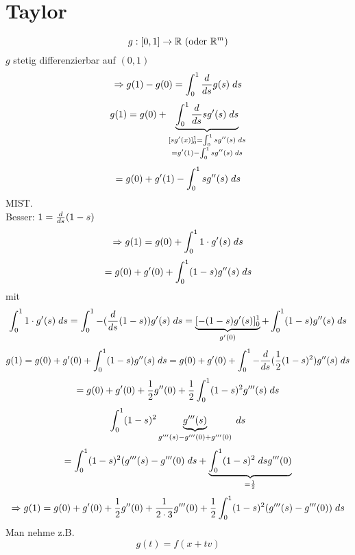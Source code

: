 \documentclass[../ana2.tex]{subfiles}
\begin{document}
\setcounter{section}{14}
\section{Taylor}
\[ \abb{g}{[0,1]}{\R} \text{ (oder \(\R^m\))} \]
\( g \) stetig differenzierbar auf \( (0,1) \) 
\[ \Rightarrow g(1) - g(0) = \integralx{\ddx{s} g(s)}{0}{1}{s} \]
\[ g(1) = g(0) + \underbrace{\integralx{\ddx{s}s g'(s)}{0}{1}{s}}
_{\substack{[sg'(x)]_0^1 = \integralx{sg''(s)}{0}{1}{s} \\
= g'(1) - \integralx{sg''(s)}{0}{1}{s}}} \]
\[ = g(0) + g'(1) - \integralx{sg''(s)}{0}{1}{s} \]
MIST.\\
Besser: \( 1 = \ddx{s} (1 - s) \)
\[ \Rightarrow g(1) = g(0) + \integralx{1 \cdot g'(s)}{0}{1}{s} \]
\[ = g(0) + g'(0) + \integralx{(1-s)g''(s)}{0}{1}{s} \]
mit
\[ \integralx{1 \cdot g'(s)}{0}{1}{s}
= \integralx{-(\ddx{s} (1-s))g'(s)}{0}{1}{s} = \underbrace{[-(1-s)g'(s)]_0^1}_{g'(0)}
+ \integralx{(1-s)g''(s)}{0}{1}{s} \]
\[ g(1) = g(0) + g'(0) + \integralx{(1-s)g''(s)}{0}{1}{s} 
= g(0) + g'(0) + \integralx{-\ddx{s} (\frac{1}{2} (1-s)^2) g''(s)}{0}{1}{s} \]
\[ = g(0) + g'(0) + \frac{1}{2}g''(0) 
+ \frac{1}{2}\integralx{(1-s)^2 g'''(s)}{0}{1}{s} \]
\[ \integralx{(1-s)^2 \underbrace{g'''(s)}_{g'''(s) - g'''(0) + g'''(0)}}{0}{1}{s} \]
\[ = \integralx{(1-s)^2(g'''(s) - g'''(0)}{0}{1}{s} 
+ \underbrace{\integralx{(1-s)^2}{0}{1}{s} g'''(0) }_{=\frac{1}{2}} \]
\[ \Rightarrow g(1) = g(0) 
+ g'(0) + \frac{1}{2}g''(0) 
+ \frac{1}{2\cdot 3} g'''(0) 
+ \frac{1}{2} \integralx{(1-s)^2(g'''(s) - g'''(0))}{0}{1}{s} \]
Man nehme z.B.
\[ g(t) = f(x+tv) \]
\end{document}
